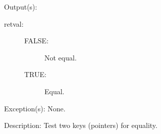 \begin{capi}
\begin{capilist}
	\item[Output(s): ]
		\begin{description}\item[]
		\item[retval: ]
			\begin{description}\item[]
			\item[FALSE: ]
				Not equal.
			\item[TRUE: ]
				Equal.
			\end{description}
		\end{description}
	\item[Exception(s): ] None.
	\item[Description: ]
		Test two keys (pointers) for equality.
	\end{capilist}
\end{capi}
